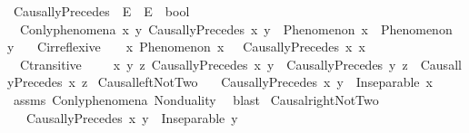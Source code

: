 \begin{isabellebody}
%
\isadelimdocument
%
\endisadelimdocument
%
\isatagdocument
%
\isamarkuptrue%
%
\endisatagdocument
{\isafolddocument}%
%
\isadelimdocument
%
\endisadelimdocument
{}\isamarkupfalse%
\ CausallyPrecedes\ {\isacharcolon}{\kern0pt}{\isacharcolon}{\kern0pt}\ {\isachardoublequoteopen}E\ {\isasymRightarrow}\ E\ {\isasymRightarrow}\ bool{\isachardoublequoteclose}\ \ \ \isanewline
\isanewline
{}\isamarkupfalse%
\ \isanewline
\ \ C{}{\isacharunderscore}{\kern0pt}only{\isacharunderscore}{\kern0pt}phenomena{\isacharcolon}{\kern0pt}\ {\isachardoublequoteopen}{\isasymforall}x\ y{\isachardot}{\kern0pt}\ CausallyPrecedes\ x\ y\ {\isasymlongrightarrow}\ Phenomenon\ x\ {\isasymand}\ Phenomenon\ y{\isachardoublequoteclose}\ \isanewline
\ \ C{}{\isacharunderscore}{\kern0pt}irreflexive{\isacharcolon}{\kern0pt}\ \ \ \ {\isachardoublequoteopen}{\isasymforall}x{\isachardot}{\kern0pt}\ Phenomenon\ x\ {\isasymlongrightarrow}\ {\isasymnot}\ CausallyPrecedes\ x\ x{\isachardoublequoteclose}\ \isanewline
\ \ C{}{\isacharunderscore}{\kern0pt}transitive{\isacharcolon}{\kern0pt}\ \ \ \ \ {\isachardoublequoteopen}{\isasymforall}x\ y\ z{\isachardot}{\kern0pt}\ CausallyPrecedes\ x\ y\ {\isasymand}\ CausallyPrecedes\ y\ z\ {\isasymlongrightarrow}\ CausallyPrecedes\ x\ z{\isachardoublequoteclose}\isanewline
\isanewline
{}\isamarkupfalse%
\ Causal{\isacharunderscore}{\kern0pt}left{\isacharunderscore}{\kern0pt}NotTwo{\isacharcolon}{\kern0pt}\isanewline
\ \ \ {\isachardoublequoteopen}CausallyPrecedes\ x\ y{\isachardoublequoteclose}\ \ {\isachardoublequoteopen}Inseparable\ x\ {\isasymOmega}{\isachardoublequoteclose}\isanewline
%
\isadelimproof
\ \ %
\endisadelimproof
%
\isatagproof
{}\isamarkupfalse%
\ assms\ C{}{\isacharunderscore}{\kern0pt}only{\isacharunderscore}{\kern0pt}phenomena\ Nonduality\ \isamarkupfalse%
\ blast%
\endisatagproof
{\isafoldproof}%
%
\isadelimproof
\isanewline
%
\endisadelimproof
\isanewline
{}\isamarkupfalse%
\ Causal{\isacharunderscore}{\kern0pt}right{\isacharunderscore}{\kern0pt}NotTwo{\isacharcolon}{\kern0pt}\isanewline
\ \ \ {\isachardoublequoteopen}CausallyPrecedes\ x\ y{\isachardoublequoteclose}\ \ {\isachardoublequoteopen}Inseparable\ y\ {\isasymOmega}{\isachardoublequoteclose}\isanewline
%
\isadelimproof

\end{isabellebody}

